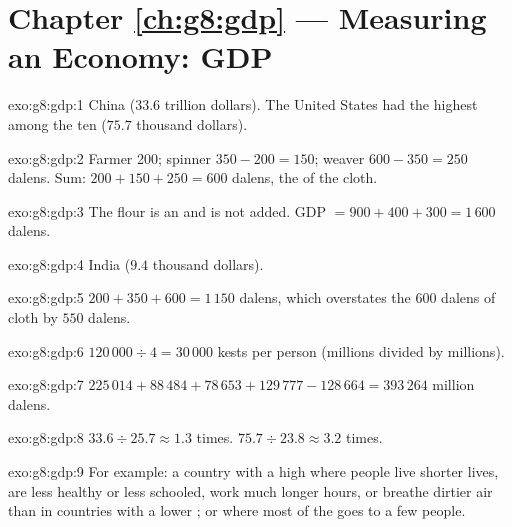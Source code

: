 \section*{Chapter \ref{ch:g8:gdp} --- Measuring an Economy: GDP}

\begin{solution}{exo:g8:gdp:1}
China ($33.6$ trillion dollars). The United States had the highest  among the ten
($75.7$ thousand dollars).
\end{solution}

\begin{solution}{exo:g8:gdp:2}
Farmer 200; spinner $350 - 200 = 150$; weaver $600 - 350 = 250$ dalens. Sum: $200 + 150 + 250 =
600$ dalens, the  of the cloth.
\end{solution}

\begin{solution}{exo:g8:gdp:3}
The flour is an  and is not added. GDP $= 900 + 400 + 300 = 1\,600$ dalens.
\end{solution}

\begin{solution}{exo:g8:gdp:4}
India ($9.4$ thousand dollars).
\end{solution}

\begin{solution}{exo:g8:gdp:5}
$200 + 350 + 600 = 1\,150$ dalens, which overstates the 600 dalens of cloth by $550$ dalens.
\end{solution}

\begin{solution}{exo:g8:gdp:6}
$120\,000 \div 4 = 30\,000$ kests per person (millions divided by millions).
\end{solution}

\begin{solution}{exo:g8:gdp:7}
$225\,014 + 88\,484 + 78\,653 + 129\,777 - 128\,664 = 393\,264$ million dalens.
\end{solution}

\begin{solution}{exo:g8:gdp:8}
$33.6 \div 25.7 \approx 1.3$ times. $75.7 \div 23.8 \approx 3.2$ times.
\end{solution}

\begin{solution}{exo:g8:gdp:9}
For example: a country with a high  where people live shorter lives, are less healthy
or less schooled, work much longer hours, or breathe dirtier air than in countries with a lower ; or where most of the  goes to a few people.
\end{solution}


